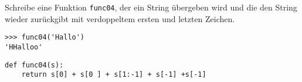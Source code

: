 \question[3] Schreibe eine Funktion \texttt{func04}, der ein String übergeben wird und die
den String wieder zurückgibt mit verdoppeltem ersten und letzten Zeichen.
\begin{lstlisting}
>>> func04('Hallo')
'HHalloo'
\end{lstlisting}
\begin{solutionbox}{4cm}
\begin{lstlisting}
def func04(s):
    return s[0] + s[0 ] + s[1:-1] + s[-1] +s[-1]
\end{lstlisting}
\end{solutionbox}
